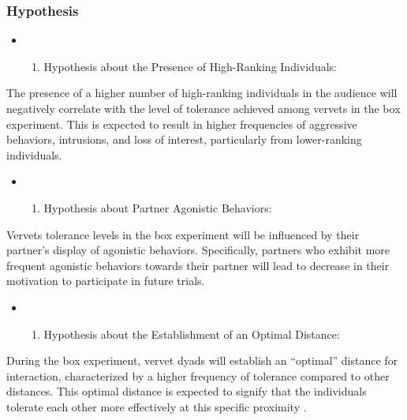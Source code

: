 \documentclass[
]{article}
\providecommand{\tightlist}{%
  \setlength{\itemsep}{0pt}\setlength{\parskip}{0pt}}
\begin{document}
\hypertarget{hypothesis}{%
\subsubsection{Hypothesis}\label{hypothesis}}

\begin{itemize}
\item
  \begin{enumerate}
  \def\labelenumi{\arabic{enumi}.}
  \tightlist
  \item
    Hypothesis about the Presence of High-Ranking Individuals:
  \end{enumerate}
\end{itemize}

The presence of a higher number of high-ranking individuals in the
audience will negatively correlate with the level of tolerance achieved
among vervets in the box experiment. This is expected to result in
higher frequencies of aggressive behaviors, intrusions, and loss of
interest, particularly from lower-ranking individuals.

\begin{itemize}
\item
  \begin{enumerate}
  \def\labelenumi{\arabic{enumi}.}
  \setcounter{enumi}{1}
  \tightlist
  \item
    Hypothesis about Partner Agonistic Behaviors:
  \end{enumerate}
\end{itemize}

Vervets tolerance levels in the box experiment will be influenced by
their partner's display of agonistic behaviors. Specifically, partners
who exhibit more frequent agonistic behaviors towards their partner will
lead to decrease in their motivation to participate in future trials.

\begin{itemize}
\item
  \begin{enumerate}
  \def\labelenumi{\arabic{enumi}.}
  \setcounter{enumi}{2}
  \tightlist
  \item
    Hypothesis about the Establishment of an Optimal Distance:
  \end{enumerate}
\end{itemize}

During the box experiment, vervet dyads will establish an ``optimal''
distance for interaction, characterized by a higher frequency of
tolerance compared to other distances. This optimal distance is expected
to signify that the individuals tolerate each other more effectively at
this specific proximity .
\end{document}
